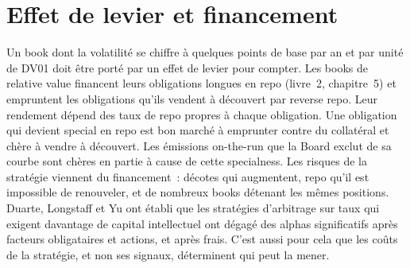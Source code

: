 \begin{omfigure}

\label{fig:s2:government-bond-relative-value:decay}
\end{omfigure}

\section{Effet de levier et financement}

Un book dont la volatilité se chiffre à quelques points de base par an et par unité de DV01 doit être porté par un effet de levier pour compter. Les books de relative value financent leurs obligations longues en
repo (livre~2, chapitre~5) et empruntent les obligations qu'ils vendent à découvert par reverse repo. Leur rendement dépend des taux de repo propres à chaque obligation. Une obligation
qui devient special en repo est bon marché à emprunter contre du collatéral et chère à vendre à découvert. Les émissions on-the-run que la Board exclut de sa courbe sont chères en partie
à cause de cette specialness. Les risques de la stratégie viennent du financement~: décotes qui augmentent, repo qu'il est impossible de renouveler, et de nombreux books détenant les mêmes
positions. Duarte, Longstaff et Yu ont établi que les stratégies d'arbitrage sur taux qui exigent davantage de capital intellectuel ont dégagé des alphas significatifs après
facteurs obligataires et actions, et après frais. C'est aussi pour cela que les coûts de la stratégie, et non ses signaux, déterminent qui peut la mener.

